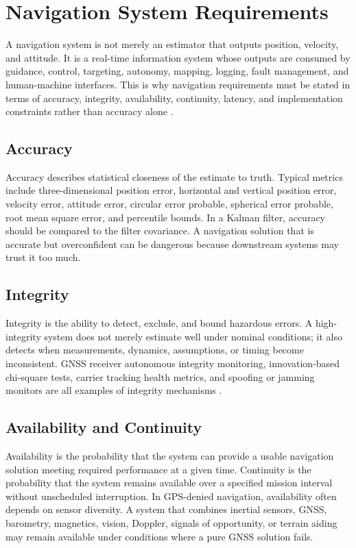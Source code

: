 \documentclass[11pt,oneside]{book}
\begin{document}
\section{Navigation System Requirements}
A navigation system is not merely an estimator that outputs position, velocity, and attitude. It is a real-time information system whose outputs are consumed by guidance, control, targeting, autonomy, mapping, logging, fault management, and human-machine interfaces. This is why navigation requirements must be stated in terms of accuracy, integrity, availability, continuity, latency, and implementation constraints rather than accuracy alone \cite{groves2013,titterton2004,farrell2008,kaplan2017}.

\subsection{Accuracy}
Accuracy describes statistical closeness of the estimate to truth. Typical metrics include three-dimensional position error, horizontal and vertical position error, velocity error, attitude error, circular error probable, spherical error probable, root mean square error, and percentile bounds. In a Kalman filter, accuracy should be compared to the filter covariance. A navigation solution that is accurate but overconfident can be dangerous because downstream systems may trust it too much.

\subsection{Integrity}
Integrity is the ability to detect, exclude, and bound hazardous errors. A high-integrity system does not merely estimate well under nominal conditions; it also detects when measurements, dynamics, assumptions, or timing become inconsistent. GNSS receiver autonomous integrity monitoring, innovation-based chi-square tests, carrier tracking health metrics, and spoofing or jamming monitors are all examples of integrity mechanisms \cite{kaplan2017,groves2013}.

\subsection{Availability and Continuity}
Availability is the probability that the system can provide a usable navigation solution meeting required performance at a given time. Continuity is the probability that the system remains available over a specified mission interval without unscheduled interruption. In GPS-denied navigation, availability often depends on sensor diversity. A system that combines inertial sensors, GNSS, barometry, magnetics, vision, Doppler, signals of opportunity, or terrain aiding may remain available under conditions where a pure GNSS solution fails.
\end{document}
